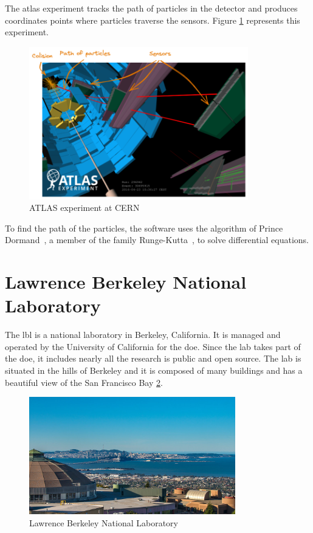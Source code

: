 The \acrfull{atlas} experiment tracks the path of particles in the detector and produces coordinates points where particles traverse the sensors.
Figure \ref{spec:fig:context:physics-simulation:lhc} represents this experiment.
\begin{figure}[ht]
    \centering
    \includegraphics[width=0.85\textwidth]{05-resources/img/spec/experiment-atlas.excalidraw.png}
    \caption{ATLAS experiment at CERN~\cite{atlas-experiment}}
    \label{spec:fig:context:physics-simulation:lhc}
\end{figure}

To find the path of the particles, the software uses the algorithm of Prince Dormand~\cite{princeDormand}, a member of the family Runge-Kutta~\cite{Runge-Kutta-methods}, to solve differential equations.


\section{Lawrence Berkeley National Laboratory}
\label{spec:ch:context:lbl}

The \acrfull{lbl} is a national laboratory in Berkeley, California.
It is managed and operated by the University of California for the \acrfull{doe}.
Since the lab takes part of the \acrshort{doe}, it includes nearly all the research is public and open source.
The lab is situated in the hills of Berkeley and it is composed of many buildings and has a beautiful view of the San Francisco Bay \ref{spec:fig:context:lbl:lab-view}.

\begin{figure}[ht]
    \centering
    \includegraphics[width=0.8\textwidth]{05-resources/img/spec/lab-view.jpg}
    \caption{Lawrence Berkeley National Laboratory}
    \label{spec:fig:context:lbl:lab-view}
\end{figure}


